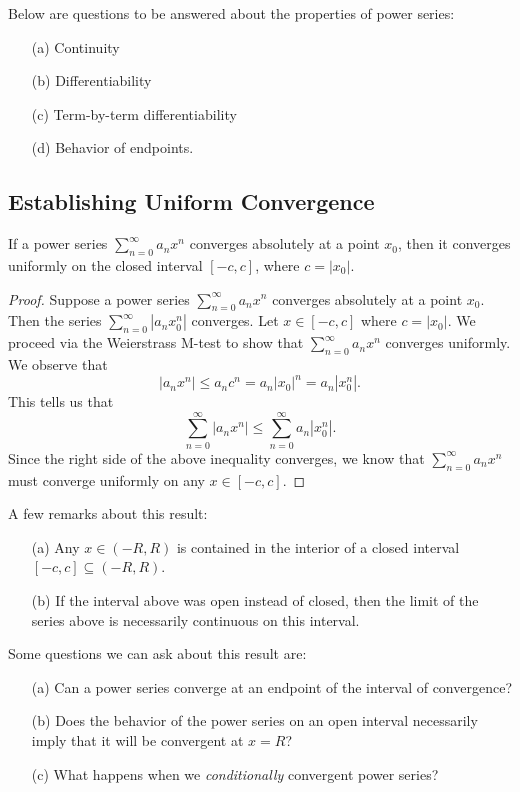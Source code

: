 Below are questions to be answered about the properties of power series:
\begin{enumerate}
    \item[(a)] Continuity
    \item[(b)] Differentiability
    \item[(c)] Term-by-term differentiability
    \item[(d)] Behavior of endpoints.
\end{enumerate}
\subsection{Establishing Uniform Convergence}

\begin{tcolorbox}
\begin{thm}
    If a power series \( \sum_{ n= 0 }^{  \infty   } a_n x^n \) converges absolutely at a point \( x_0  \), then it converges uniformly on the closed interval \( [-c , c ] \), where \( c  = | x_0  |  \).
\end{thm}
\end{tcolorbox}

\begin{proof}
    Suppose a power series \( \sum_{ n=0  }^{  \infty   } a_n x^n  \) converges absolutely at a point \( x_0  \). Then the series \(  \sum_{ n=0  }^{  \infty  } | a_n x_0^n |  \) converges. Let \( x \in [-c , c ] \) where \( c = | x_0  |  \). We proceed via the Weierstrass M-test to show that \( \sum_{ n=0  }^{ \infty  } a_n x^n  \) converges uniformly. We observe that 
    \[  | a_n x^n  |  \leq a_n c^n = a_n | x_0  |^n = a_n | x_0^n | .  \]
    This tells us that 
    \[  \sum_{ n=0 }^{  \infty   } | a_n x^n | \leq \sum_{ n=0  }^{ \infty  } a_n | x_0^n  |.   \]
    Since the right side of the above inequality converges, we know that \( \sum_{ n=0  }^{ \infty  } a_n x^n  \) must converge uniformly on any \( x \in [-c ,c ]  \).
\end{proof}
A few remarks about this result:
\begin{enumerate}
    \item[(a)] Any \( x \in (-R, R ) \) is contained in the interior of a closed interval \( [-c , c ]  \subseteq (-R ,R )\).
    \item[(b)] If the interval above was open instead of closed, then the limit of the series above is necessarily continuous on this interval. 
\end{enumerate}

Some questions we can ask about this result are:
\begin{enumerate}
    \item[(a)] Can a power series converge at an endpoint of the interval of convergence? 
    \item[(b)] Does the behavior of the power series on an open interval necessarily imply that it will be convergent at \( x = R  \)? 
    \item[(c)] What happens when we \textit{conditionally} convergent power series?
\end{enumerate}


